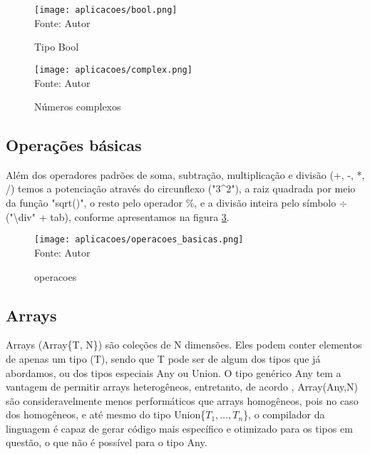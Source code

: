     \begin{figure}[H]
    \begin{center}
        \caption{Tipo Bool} \label{bool}
        \texttt{[image: aplicacoes/bool.png]} \\
        {\tiny \sf Fonte: Autor}
    \end{center}
    \end{figure} 

  \begin{figure}[H]
  \begin{center}
      \caption{Números complexos} \label{complex}
      \texttt{[image: aplicacoes/complex.png]} \\
      {\tiny \sf Fonte: Autor}
  \end{center}
  \end{figure} 

\subsection{Operações básicas}
Além dos operadores padrões de soma, subtração, multiplicação e divisão (+, -, *, /) temos a potenciação através do circunflexo ("3\^{}2"), a raiz quadrada por meio da função "sqrt()", o resto pelo operador \%, e a divisão inteira pelo símbolo $\div$ ("\textbackslash div" + tab), conforme apresentamos na figura \ref{operacoes}. 

    \begin{figure}[H]
    \begin{center}
        \caption{operacoes} \label{operacoes}
        \texttt{[image: aplicacoes/operacoes\_basicas.png]} \\
        {\tiny \sf Fonte: Autor}
    \end{center}
    \end{figure} 



\subsection{Arrays}
Arrays (Array\{T, N\}) são coleções de N dimensões. %
 Eles podem conter elementos de apenas um tipo (T), sendo que T pode ser de algum dos tipos que já abordamos, ou dos tipos especiais Any ou Union{}. O tipo genérico Any tem a vantagem de permitir arrays heterogêneos, entretanto, de acordo \cite{Lobianco2019}, Array(Any,N) são consideravelmente menos performáticos que arrays homogêneos, pois no caso dos homogêneos, e até mesmo do tipo Union\{$T_1,...,T_n$\}, o compilador da linguagem é capaz de gerar código mais específico e otimizado para os tipos em questão, o que não é possível para o tipo Any.  


